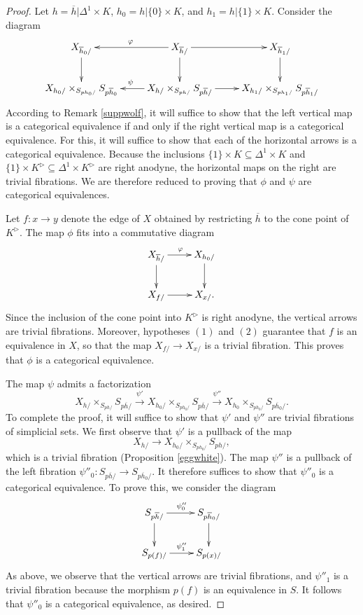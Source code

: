 \begin{proof}
Let $h = \overline{h} | \Delta^1 \times K$, $h_0 = h | \{0\} \times K$, and $h_1 = h | \{1\} \times K$.
Consider the diagram
$$ \xymatrix{ X_{\overline{h}_0/} \ar[d] & X_{\overline{h}/} \ar[l]_{\phi} \ar[r] \ar[d] & X_{\overline{h}_1/} \ar[d] \\
X_{h_0/} \times_{S_{p  h_0/} } S_{p  \overline{h}_0} &
X_{h/} \times_{S_{p  h/}} S_{p  \overline{h}/} \ar[r] \ar[l]_{\psi} &
X_{h_1/} \times_{S_{p  h_1/}} S_{p  \overline{h}_1/} }$$
According to Remark \ref{suppwolf}, it will suffice to show that the left vertical map is a categorical equivalence if and only if the right vertical map is a categorical equivalence. For this, it will suffice to show that each of the horizontal arrows is a categorical equivalence. Because the inclusions
$\{1\} \times K \subseteq \Delta^1 \times K$ and $\{1\} \times K^{\triangleright} \subseteq
\Delta^1 \times K^{\triangleright}$ are right anodyne, the horizontal maps on the right are trivial fibrations. We are therefore reduced to proving that $\phi$ and $\psi$ are categorical equivalences.

Let $f: x \rightarrow y$ denote the edge of $X$ obtained by restricting $\overline{h}$ to the cone point of $K^{\triangleright}$. The map $\phi$ fits into a commutative diagram
$$ \xymatrix{ X_{\overline{h}/} \ar[r]^{\phi} \ar[d] & X_{h_0/} \ar[d] \\
X_{f/} \ar[r] & X_{x/}. }$$
Since the inclusion of the cone point into $K^{\triangleright}$ is right anodyne, the vertical arrows are trivial fibrations. Moreover, hypotheses $(1)$ and $(2)$ guarantee that $f$ is an equivalence in $X$, so that the map $X_{f/} \rightarrow X_{x/}$ is a trivial fibration. This proves that $\phi$ is a categorical equivalence.

The map $\psi$ admits a factorization
$$ X_{h/} \times_{S_{p  h/}} S_{p  \overline{h}/}
\stackrel{\psi'}{\rightarrow} 
X_{h_0/} \times_{ S_{p  h_0/}} S_{p  \overline{h}/}
\stackrel{\psi''}{\rightarrow}
X_{h_0} \times_{ S_{p  h_0/}} S_{ p  \overline{h}_0/}.$$
To complete the proof, it will suffice to show that $\psi'$ and $\psi''$ are trivial fibrations of simplicial sets. We first observe that $\psi'$ is a pullback of the map
$$X_{h/} \rightarrow X_{h_0/} \times_{S_{p  h_0/} } S_{p  h/},$$
which is a trivial fibration (Proposition \ref{eggwhite}). The map $\psi''$
is a pullback of the left fibration $\psi''_0: S_{p  \overline{h}/} \rightarrow S_{p  \overline{h}_0/}$. It therefore suffices to show that $\psi''_0$ is a categorical equivalence.
To prove this, we consider the diagram
$$ \xymatrix{ S_{p  \overline{h}/} \ar[r]^{\psi''_0} \ar[d] & S_{p  \overline{h}_0/} \ar[d] \\
S_{p(f)/} \ar[r]^{\psi''_1} & S_{p(x)/} }$$
As above, we observe that the vertical arrows are trivial fibrations, and $\psi''_1$ is a trivial fibration because the morphism $p(f)$ is an equivalence in $S$. It follows that $\psi''_0$ is a categorical equivalence, as desired.
\end{proof}

